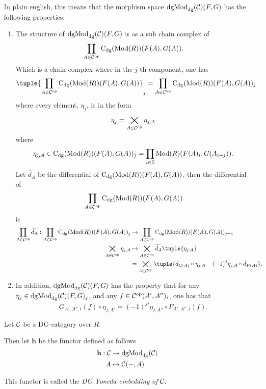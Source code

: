 \begin{remark}
    In plain english, this means that the morphism space \( \operatorname{dgMod}_{\operatorname{dg}}({\mathcal{C}})(F, G) \) has the following properties:
    \begin{enumerate}
        \item {
            The structure of \( \operatorname{dgMod}_{\operatorname{dg}}({\mathcal{C}})(F, G) \) is as a sub chain complex of
            \[
                \prod_{A \in {\mathcal{C}}^{\operatorname{op}}} \operatorname{C}_{\operatorname{dg}}(\operatorname{Mod}(R))(F(A), G(A)).
            \]
            Which is a chain complex where in the \( j \)-th component, one has
            \[
                \tuple{ \prod_{A \in \Cc^{\op}} \C_{\dg}(\Mod(R))(F(A), G(A)) }_j = \prod_{A \in \Cc^{\op}} \C_{\dg}(\Mod(R))(F(A), G(A))_j
            \]
            where every element, \( \eta_j \), is in the form
            \[
                \eta_j = \bigtimes_{A \in {\mathcal{C}}^{\operatorname{op}}} \eta_{j, A}
            \]
            where
            \[
                \eta_{j, A} \in \operatorname{C}_{\operatorname{dg}}(\operatorname{Mod}(R))(F(A), G(A))_j = \prod_{i \in {\mathbb{Z}}} \operatorname{Mod}(R)(F(A)_i, G(A_{i + j})).
            \]
            Let \( \widetilde{d_A} \) be the differential of \( \operatorname{C}_{\operatorname{dg}}(\operatorname{Mod}(R))(F(A), G(A)) \), then the differential of
            \[
                \prod_{A \in {\mathcal{C}}^{\operatorname{op}}} \operatorname{C}_{\operatorname{dg}}(\operatorname{Mod}(R))(F(A), G(A))
            \]
            is
            \begin{align*}
                \prod_{A \in \Cc^{\op}} \widetilde{d_A} : \prod_{A \in \Cc^{\op}} \C_{\dg}(\Mod(R))(F(A), G(A))_j &\to \prod_{A \in \Cc^{\op}} \C_{\dg}(\Mod(R))(F(A), G(A))_{j + 1} \\
                \bigtimes_{A \in \Cc^{\op}} \eta_{j, A} &\mapsto \bigtimes_{A \in \Cc^{\op}} \widetilde{d_A}\tuple{\eta_{j, A}} \\
                &= \bigtimes_{A \in \Cc^{\op}} \tuple{ d_{G(A)} \circ \eta_{j, A} - (-1)^j \eta_{j, A} \circ d_{F(A)} }.
            \end{align*}
        }
        \item {
            In addition, \( \operatorname{dgMod}_{\operatorname{dg}}({\mathcal{C}})(F, G) \) has the property that for any \( \eta_j \in \operatorname{dgMod}_{\operatorname{dg}}({\mathcal{C}})(F, G)_j \), and any \( f \in {\mathcal{C}}^{\operatorname{op}}(A', A'')_i \), one has that
            \[
                G_{A', A'', i}(f) \circ \eta_{j, A'} = (-1)^{ji} \eta_{j, A''} \circ F_{A', A'', i}(f).
            \]
        }
    \end{enumerate} 
\end{remark}

\begin{definition}
    \label{def:DG_Yoneda_embedding}
    Let \( {\mathcal{C}} \) be a DG-category over \( R \).
    
    Then let \( \mathbf{h} \) be the functor defined as follows
    \begin{align*}
        \mathbf{h}: {\mathcal{C}} &\to \operatorname{dgMod}_{\operatorname{dg}}({\mathcal{C}}) \\
        A &\mapsto {\mathcal{C}}(-, A)
    \end{align*}

    This functor is called the \emph{DG Yoneda embedding of \( {\mathcal{C}} \)}.
\end{definition}

